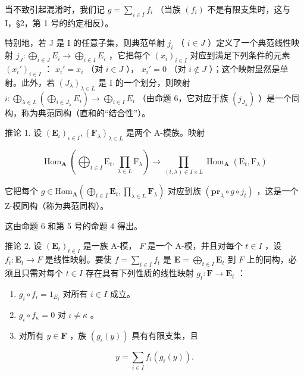 当不致引起混淆时，我们记 \(g = \sum_{i \in I} f_i\) （当族 \((f_i)\) 不是有限支集时，这与 I，§2，第 1 号的约定相反）。

特别地，若 J 是 I 的任意子集，则典范单射 \(j_{i}\) （ \(i \in J\) ）定义了一个典范线性映射 \(j_{J}: \bigoplus_{i \in J} E_{i} \to \bigoplus_{i \in I} E_{i}\) ，它把每个 \((x_{i})_{i \in I}\) 对应到满足下列条件的元素 \((x_{i}')_{i \in I}\) ： \(x_{i}' = x_{i}\) （对 \(i \in J\) ）， \(x_{i}' = 0\) （对 \(i \notin J\) ）；这个映射显然是单射。此外，若 \((J_{\lambda})_{\lambda \in L}\) 是 I 的一个划分，则映射 \(i: \bigoplus_{\lambda \in L} \left( \bigoplus_{i \in J_{\lambda}} E_{i} \right) \to \bigoplus_{i \in I} E_{i}\) （由命题 6，它对应于族 \((j_{J_{\lambda}})\) ）是一个同构，称为典范同构（直和的“结合性”）。

推论 1. 设 \((\mathbf{E}_{\iota})_{\iota \in I}, (\mathbf{F}_{\lambda})_{\lambda \in L}\) 是两个 A-模族。映射

\[
\operatorname{Hom} _ {\mathbf {A}} \left(\bigoplus_ {t \in I} \mathrm{E} _ {t}, \prod_ {\lambda \in L} \mathrm{F} _ {\lambda}\right)\rightarrow \prod_ {(t, \lambda) \in I \times L} \operatorname{Hom} _ {\mathbf {A}} \left(\mathrm{E} _ {t}, \mathrm{F} _ {\lambda}\right)\tag{22}
\]

它把每个 \(g \in \mathrm{Hom}_{\mathbf{A}} \left( \bigoplus_{t \in I} \mathbf{E}_t, \prod_{\lambda \in L} \mathbf{F}_\lambda \right)\) 对应到族 \((\mathbf{pr}_\lambda \circ g \circ j_t)\) ，这是一个 Z-模同构（称为典范同构）。

这由命题 6 和第 5 号的命题 4 得出。

推论 2. 设 \((\mathbf{E}_t)_{t \in I}\) 是一族 A-模， \(F\) 是一个 A-模，并且对每个 \(t \in I\) ，设 \(f_t: \mathbf{E}_t \to F\) 是线性映射。要使 \(f = \sum_{t \in I} f_t\) 是 \(\mathbf{E} = \bigoplus_{t \in I} \mathbf{E}_t\) 到 \(F\) 上的同构，必须且只需对每个 \(t \in I\) 存在具有下列性质的线性映射 \(g_t: \mathbf{F} \to \mathbf{E}_t\) ：

\begin{enumerate}
\def\labelenumi{(\arabic{enumi})}
\item
  \(g_{i} \circ f_{i} = 1_{E_{i}}\) 对所有 \(i \in I\) 成立。
\item
  \(g_{\iota} \circ f_{\kappa} = 0\) 对 \(\iota \neq \kappa\) 。
\item
  对所有 \(y \in \mathbf{F}\) ，族 \((g_{\iota}(y))\) 具有有限支集，且
\end{enumerate}

\[
y = \sum_ {i \in I} f _ {i} (g _ {i} (y)).\tag{23}
\]

